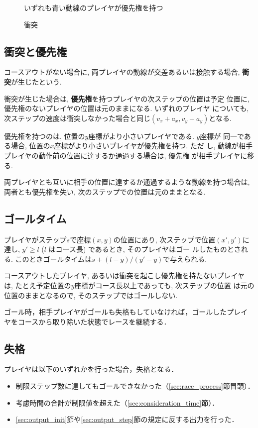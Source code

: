 \documentclass[11pt]{jarticle}
\newcommand\secref[1]{\mbox{\ref{#1}節}}
\begin{document}
\begin{figure}
  \caption{衝突}
  \label{fig:collision}
  いずれも青い動線のプレイヤが優先権を持つ
  \vspace{-1.5cm}
\end{figure}

\subsection{衝突と優先権}
コースアウトがない場合に, 両プレイヤの動線が交差あるいは接触する場合,
{\bf 衝突}が生じたという.

衝突が生じた場合は, {\bf 優先権}を持つプレイヤの次ステップの位置は予定
位置に, 優先権のないプレイヤの位置は元のままになる.  いずれのプレイヤ
についても, 次ステップの速度は衝突しなかった場合と同じ$(v_x+a_x,
v_y+a_y)$となる.

優先権を持つのは, 位置の$y$座標がより小さいプレイヤである.  $y$座標が
同一である場合, 位置の$x$座標がより小さいプレイヤが優先権を持つ. ただ
し, 動線が相手プレイヤの動作前の位置に達するか通過する場合は, 優先権
が相手プレイヤに移る.

両プレイヤとも互いに相手の位置に達するか通過するような動線を持つ場合は,
両者とも優先権を失い, 次のステップでの位置は元のままとなる.

\subsection{ゴールタイム}
プレイヤがステップ$s$で座標$(x, y)$の位置にあり, 次ステップで位置$(x',
y')$に達し, $y'\ge l$ ($l$ はコース長) であるとき, そのプレイヤはゴー
ルしたものとされる.  このときゴールタイムは$s + (l-y)/(y'-y)$で与えられる.

コースアウトしたプレイヤ, あるいは衝突を起こし優先権を持たないプレイヤ
は, たとえ予定位置の$y$座標がコース長以上であっても, 次ステップの位置
は元の位置のままとなるので, そのステップではゴールしない.

ゴール時，相手プレイヤがゴールも失格もしていなければ，ゴールしたプレイ
ヤをコースから取り除いた状態でレースを継続する．

\subsection{失格}\label{sec:disqualification}
プレイヤは以下のいずれかを行った場合，失格となる．
\begin{itemize}
\item 制限ステップ数に達してもゴールできなかった（\secref{sec:race_process}冒頭）．
\item 考慮時間の合計が制限値を超えた（\secref{sec:consideration_time}）．
\item \secref{sec:output_init}や\secref{sec:output_step}の規定に反する出力を行った．
\end{itemize}
\end{document}
